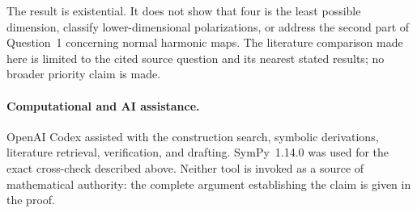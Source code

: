 \documentclass[11pt]{article}
\begin{document}
The result is existential.  It does not show that four is the least possible
dimension, classify lower-dimensional polarizations, or address the second
part of Question~1 concerning normal harmonic maps.  The literature
comparison made here is limited to the cited source question and its nearest
stated results; no broader priority claim is made.

\paragraph{Computational and AI assistance.}
OpenAI Codex assisted with the construction search, symbolic derivations,
literature retrieval, verification, and drafting.  SymPy~1.14.0 was used for
the exact cross-check described above.  Neither tool is invoked as a source
of mathematical authority: the complete argument establishing the claim is
given in the proof.



\end{document}
